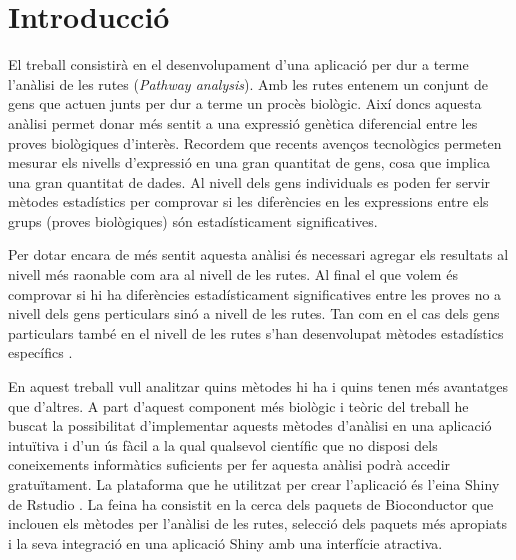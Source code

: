 

%
%
% 
% 
% 

\newenvironment{mykeithtabbing}[1]{%
\begin{tabular}{lp{0.9\hsize}}
}{%
\end{tabular}
}

\newcommand{\mybadgood}[2]{%
\begin{mykeithtabbing}
{}\emph{Bad:} & \sout{#1} \\
\emph{Good:} & #2 \\
\end{mykeithtabbing}
}



\chapter{Introducció}

El treball consistirà en el desenvolupament d'una aplicació per dur a terme l'anàlisi de les rutes (\textit{Pathway analysis}). Amb les rutes entenem un conjunt de gens que actuen junts per dur a terme un procès biològic. Així doncs aquesta anàlisi permet donar més sentit a una expressió genètica diferencial entre les proves biològiques d'interès. Recordem que recents avenços tecnològics permeten mesurar els nivells d'expressió en una gran quantitat de gens, cosa que implica una gran quantitat de dades. Al nivell dels gens individuals es poden fer servir mètodes estadístics per comprovar si les diferències en les expressions entre els grups (proves biològiques) són estadísticament significatives. 

Per dotar encara de més sentit aquesta anàlisi és necessari agregar els resultats al nivell més raonable com ara al nivell de les rutes. Al final el que volem és comprovar si hi ha diferències estadísticament significatives entre les proves no a nivell dels gens perticulars sinó a nivell de les rutes. Tan com en el cas dels gens particulars també en el nivell de les rutes s'han desenvolupat mètodes estadístics específics \cite{khatri2012ten}. 

En aquest treball vull analitzar quins mètodes hi ha i quins tenen més avantatges que d'altres. A part d'aquest component més biològic i teòric del treball he buscat la possibilitat d'implementar aquests mètodes d'anàlisi en una aplicació intuïtiva i d'un ús fàcil a la qual qualsevol científic que no disposi dels coneixements informàtics suficients per fer aquesta anàlisi podrà accedir gratuïtament. La plataforma que he utilitzat per crear l'aplicació és l'eina Shiny de Rstudio \cite{Shiny}. La feina ha consistit en la cerca dels paquets de \gls{Bioconductor} que inclouen els mètodes per l'anàlisi de les rutes, selecció dels paquets més apropiats i la seva integració en una aplicació Shiny amb una interfície atractiva. 

